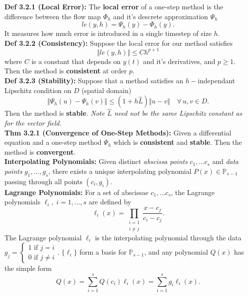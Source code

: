 \documentclass[10pt,a4paper]{article}
\renewcommand{\P}{\mathbb{P}}
\newcommand{\norm}[1]{\Vert #1 \Vert}
\begin{document}
\begin{multicols*}{2}
\textbf{Def 3.2.1 (Local Error):} The \textbf{local error} of a one-step method is the difference between the flow map $\Phi_h$ and it's descrete approximation $\Psi_h$ 
\[ le(y, h) = \Psi_h(y) - \Phi_h(y).\]
It measures how much error is introduced in a single timestep of size $h$.\\

\textbf{Def 3.2.2 (Consistency):} Suppose the local error for our method satisfies 
\[ \Vert le(y, h) \Vert \leq Ch^{p + 1} \]
 where $C$ is a constant that depends on $y(t)$ and it's derivatives, and $p \geq 1$. Then the method is \textbf{consistent} at order $p$.\\

\textbf{Def 3.2.3 (Stability):} Suppose that a method satisfies an $h-$independant Lipschitz condition on $D$ (spatial domain)
 \[ \norm{\Psi_h(u) - \Psi_h(v)} \leq (1 + h\hat L)\norm{u - v} \quad \forall\, u, v \in D. \]
 Then the method is \textbf{stable}. \textit{Note $\hat L$ need not be the same Lipschitz constant as for the vector field.}\\

\textbf{Thm 3.2.1 (Convergence of One-Step Methods):} Given a differential equation and a one-step method $\Psi_h$ which is \textbf{consistent} and \textbf{stable}. Then the method is \textbf{convergent}.\\

\textbf{Interpolating Polynomials:} Given distinct \textit{abscissa points} $c_1, ... c_s$ and \textit{data points} $g_1, ..., g_s$, there exists a unique interpolating polynomial $P(x) \in \P_{s - 1}$ passing through all points $(c_i, g_i)$.\\

\textbf{Lagrange Polynomials:} For a set of abscissae $c_1, ... c_s$, the Lagrange polynomials $\ell_i, \; i = 1,...,s$ are defined by \[
\ell_i(x) = \prod_{\begin{smallmatrix}i = 1 \\ i \neq j\end{smallmatrix}} \frac{x - c_j}{c_i - c_j}.
\]
The Lagrange polynomial $\ell_i$ is the interpolating polynomial through the data $g_j = \begin{cases*} 1 \text{ if } j = i \\ 0 \text{ if } j \neq i \end{cases*}$. $\{\ell_i\}$ form a basis for $\P_{s-1}$, and any polynomial $Q(x)$ has the simple form \[
Q(x) = \sum_{i=1}^s Q(c_i) \ell_i(x) =  \sum_{i=1}^s g_i \ell_i(x) .   
\]

\end{multicols*}
\end{document}
